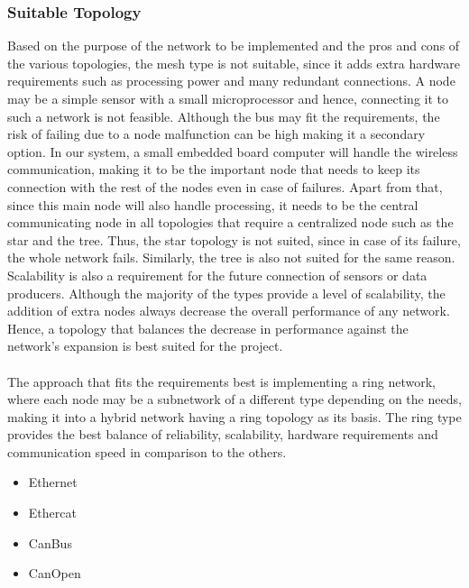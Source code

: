 \subsubsection{Suitable Topology}
Based on the purpose of the network to be implemented and the pros and cons of the various topologies, the mesh type is not suitable, since it adds extra hardware requirements such as processing power and many redundant connections. A node may be a simple sensor with a small microprocessor and hence, connecting it to such a network is not feasible. Although the bus may fit the requirements, the risk of failing due to a node malfunction can be high making it a secondary option. In our system, a small embedded board computer will handle the wireless communication, making it to be the important node that needs to keep its connection with the rest of the nodes even in case of failures. Apart from that, since this main node will also handle processing, it needs to be the central communicating node in all topologies that require a centralized node such as the star and the tree. Thus, the star topology is not suited, since in case of its failure, the whole network fails. Similarly, the tree is also not suited for the same reason. Scalability is also a requirement for the future connection of sensors or data producers. Although the majority of the types provide a level of scalability, the addition of extra nodes always decrease the overall performance of any network. Hence, a topology that balances the decrease in performance against the network's expansion is best suited for the project.\\\\
The approach that fits the requirements best is implementing a ring network, where each node may be a subnetwork of a different type depending on the needs, making it into a hybrid network having a ring topology as its basis. The ring type provides the best balance of reliability, scalability, hardware requirements and communication speed in comparison to the others.

\begin{itemize}
\item Ethernet
\item Ethercat
\item CanBus
\item CanOpen

\end{itemize}




